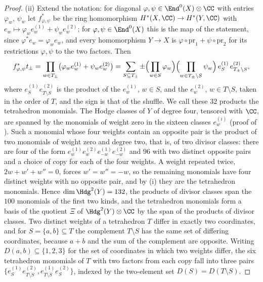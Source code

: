 \begin{proof}
(ii) Extend the notation: for diagonal $\varphi,\psi\in\End^{0}(X)\otimes\CC$
with entries $\varphi_{w}$, $\psi_{w}$ let $f_{\varphi,\psi}^{*}$ be the ring
homomorphism $H^{*}(X,\CC)\to H^{*}(Y,\CC)$ with
$e_{w}\mapsto\varphi_{w}e^{(1)}_{w}+\psi_{w}e^{(2)}_{w}$; for
$\varphi,\psi\in\End^{0}(X)$ this is the map of the statement, since
$\varphi^{*}e_{w}=\varphi_{w}e_{w}$, and every homomorphism $Y\to X$ is
$\varphi\circ\mathrm{pr}_{1}+\psi\circ\mathrm{pr}_{2}$ for its restrictions
$\varphi,\psi$ to the two factors. Then
\begin{equation}\label{eq:pullbacktet}
  f_{\varphi,\psi}^{*}t_{\pm}
  =\prod_{w\in T_{\pm}}\bigl(\varphi_{w}e^{(1)}_{w}+\psi_{w}e^{(2)}_{w}\bigr)
  =\sum_{S\subseteq T_{\pm}}\pm\Bigl(\prod_{w\in S}\varphi_{w}\Bigr)
  \Bigl(\prod_{w\in T_{\pm}\setminus S}\psi_{w}\Bigr)\,
  e^{(1)}_{S}\,e^{(2)}_{T_{\pm}\setminus S},
\end{equation}
where $e^{(1)}_{S}e^{(2)}_{T\setminus S}$ is the product of the $e^{(1)}_{w}$,
$w\in S$, and the $e^{(2)}_{w}$, $w\in T\setminus S$, taken in the order of
$T$, and the sign is that of the shuffle. We call these $32$ products the
tetrahedron monomials. The Hodge classes of $Y$ of degree four, tensored with
$\CC$, are spanned by the monomials of weight zero in the sixteen classes
$e^{(i)}_{w}$ (proof of ). Such a monomial whose four
weights contain an opposite pair is the product of two monomials of weight
zero and degree two, that is, of two divisor classes: there are four of the
form $e^{(1)}_{w}e^{(2)}_{w}e^{(1)}_{-w}e^{(2)}_{-w}$ and $96$ with two
distinct opposite pairs and a choice of copy for each of the four weights.
A weight repeated twice, $2w+w'+w''=0$, forces $w'=w''=-w$, so the remaining
monomials have four distinct weights with no opposite pair, and by (i) they
are the tetrahedron monomials. Hence $\dim\Hdg^{2}(Y)=132$, the products of
divisor classes span the $100$ monomials of the first two kinds, and the
tetrahedron monomials form a basis of the quotient $\Xi$ of
$\Hdg^{2}(Y)\otimes\CC$ by the span of the products of divisor classes. Two
distinct weights of a tetrahedron $T$ differ in exactly two coordinates, and
for $S=\{a,b\}\subseteq T$ the complement $T\setminus S$ has the same set of
differing coordinates, because $a+b$ and the sum of the complement are
opposite. Writing $D(a,b)\subseteq\{1,2,3\}$ for the set of coordinates in
which two weights differ, the six tetrahedron monomials of $T$ with two
factors from each copy fall into three pairs
$\{e^{(1)}_{S}e^{(2)}_{T\setminus S},e^{(1)}_{T\setminus S}e^{(2)}_{S}\}$,
indexed by the two-element set $D(S)=D(T\setminus S)$.


\end{proof}
